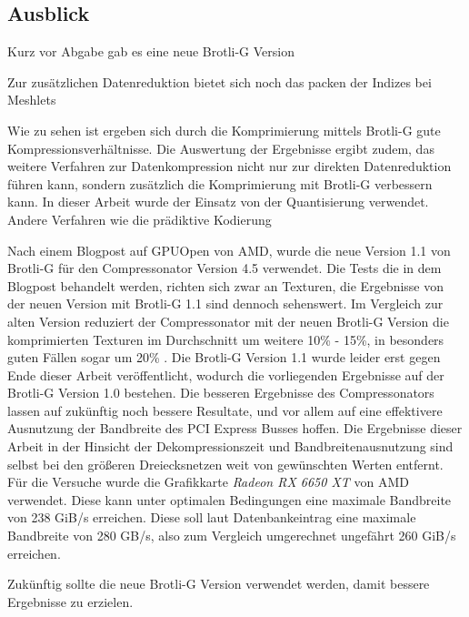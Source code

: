 \subsection{Ausblick}
\label{subsec:ausblick}
Kurz vor Abgabe gab es eine neue Brotli-G Version 

Zur zusätzlichen Datenreduktion bietet sich noch das packen der Indizes bei Meshlets

Wie zu sehen ist ergeben sich durch die Komprimierung mittels Brotli-G gute Kompressionsverhältnisse.
Die Auswertung der Ergebnisse ergibt zudem, das weitere Verfahren zur Datenkompression nicht nur zur direkten Datenreduktion führen kann, sondern zusätzlich die Komprimierung mit Brotli-G verbessern kann.
In dieser Arbeit wurde der Einsatz von der Quantisierung verwendet.
Andere Verfahren wie die prädiktive Kodierung 

Nach einem Blogpost auf GPUOpen von AMD, wurde die neue Version 1.1 von Brotli-G für den Compressonator Version 4.5 verwendet.
Die Tests die in dem Blogpost behandelt werden, richten sich zwar an Texturen, die Ergebnisse von der neuen Version mit Brotli-G 1.1 sind dennoch sehenswert.
Im Vergleich zur alten Version reduziert der Compressonator mit der neuen Brotli-G Version die komprimierten Texturen im Durchschnitt um weitere 10\% - 15\%, in besonders guten Fällen sogar um 20\% \cite{Levesque2024}.
Die Brotli-G Version 1.1 wurde leider erst gegen Ende dieser Arbeit veröffentlicht, wodurch die vorliegenden Ergebnisse auf der Brotli-G Version 1.0 bestehen.
Die besseren Ergebnisse des Compressonators lassen auf zukünftig noch bessere Resultate, und vor allem auf eine effektivere Ausnutzung der Bandbreite des PCI Express Busses hoffen.
Die Ergebnisse dieser Arbeit in der Hinsicht der Dekompressionszeit und Bandbreitenausnutzung sind selbst bei den größeren Dreiecksnetzen weit von gewünschten Werten entfernt.
Für die Versuche wurde die Grafikkarte \textit{Radeon RX 6650 XT} von AMD verwendet.
Diese kann unter optimalen Bedingungen eine maximale Bandbreite von 238 GiB/s erreichen.
Diese soll laut Datenbankeintrag eine maximale Bandbreite von 280 GB/s, also zum Vergleich umgerechnet ungefährt 260 GiB/s erreichen.

Zukünftig sollte die neue Brotli-G Version verwendet werden, damit bessere Ergebnisse zu erzielen.

